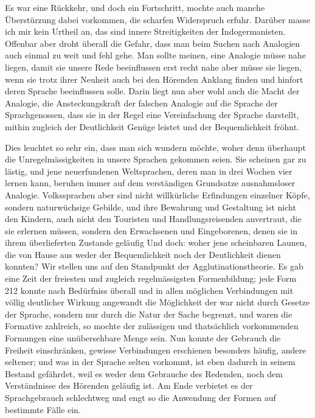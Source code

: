 {Es war eine Rückkehr, und doch ein Fortschritt, mochte auch manche Überstürzung dabei vorkommen, die scharfen Widerspruch erfuhr. Darüber masse ich mir kein Urtheil an, das sind innere Streitigkeiten der Indogermanisten. Offenbar aber droht überall die Gefahr, dass man  beim Suchen nach Analogien auch einmal zu weit und fehl gehe. Man sollte meinen, eine Analogie müsse nahe liegen, damit sie unsere Rede beeinflussen  erst recht nahe aber müsse sie liegen, wenn sie trotz ihrer Neuheit auch bei den Hörenden Anklang finden und hinfort deren Sprache beeinflussen solle. Darin liegt nun aber wohl auch die Macht der Analogie, die Ansteckungskraft der falschen Ana\label{fp.212}logie auf die Sprache der Sprachgenossen, dass sie in der Regel eine Vereinfachung der Sprache darstellt, mithin zugleich der Deutlichkeit Genüge leistet und der Bequemlichkeit fröhnt.

Dies leuchtet so sehr ein, dass man sich wundern möchte, woher denn überhaupt die Unregelmässigkeiten in unsere Sprachen gekommen seien. Sie scheinen gar zu lästig, und jene neuerfundenen Weltsprachen, deren man in drei Wochen vier lernen kann, beruhen immer auf dem verständigen Grundsatze ausnahmsloser Analogie. Volkssprachen aber sind nicht willkürliche Erfindungen einzelner Köpfe, sondern naturwüchsige Gebilde, und ihre Bewahrung und Gestaltung ist nicht den Kindern, auch nicht den Touristen und Handlungsreisenden anvertraut, die sie erlernen müssen, sondern den Erwachsenen und Eingeborenen, denen sie in ihrem überlieferten Zustande geläufig  Und doch: woher jene scheinbaren Launen, die von Hause aus weder der Bequemlichkeit noch der Deutlichkeit dienen konnten? Wir stellen uns auf den Standpunkt der Agglutinationstheorie. Es gab eine Zeit der freiesten und zugleich regelmässigsten Formenbildung; jede Form 212{\textbar}{\textbar}\label{sp.212} konnte  nach Bedürfniss überall und in allen möglichen Verbindungen mit völlig deutlicher Wirkung angewandt  die Möglichkeit der  war nicht durch Gesetze der Sprache, sondern nur durch die Natur der Sache begrenzt, und waren die Formative zahlreich, so mochte der zulässigen und thatsächlich vorkommenden Formungen eine unübersehbare Menge sein. Nun konnte der Gebrauch die Freiheit einschränken, gewisse Verbindungen erschienen besonders häufig, andere seltener; und was in der Sprache selten vorkommt, ist eben dadurch in seinem Bestand gefährdet, weil es weder dem Gebrauche des Redenden, noch dem Verständnisse des Hörenden geläufig ist. Am Ende verbietet es der Sprachgebrauch schlechtweg und engt so die Anwendung der Formen auf bestimmte Fälle ein.

}
